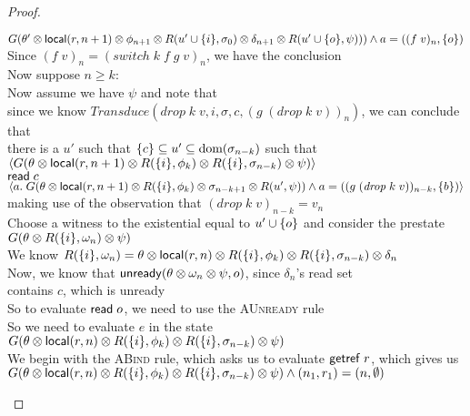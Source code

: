 \begin{proof}
\begin{tabbedproof}
\ooo $G(\theta' \otimes \mathsf{local}({r}, {n+1}) \otimes \phi_{n+1} \otimes R(u' \cup \{{i}\}, \sigma_0) \otimes \delta_{n+1} \otimes R(u' \cup \{{o}\}, \psi))) \land a = ((f\;v)_n, \{{o}\})$\\
\ooo Since $(f\;v)_n = (\mathit{switch}\;k\;f\;g\;v)_n$, we have the conclusion \\
\oo Now suppose $n \geq k$: \\
\ooo Now assume we have $\psi$ and note that  \\
\oooo since we know $\mathit{Transduce}(\mathit{drop}\;k\;v, i, \sigma, c, (g\;(\mathit{drop}\;k\;v))_n)$, we can conclude that \\
\oooo there is a $u'$ such that $\{{c}\} \subseteq u' \subseteq \mbox{dom}({\sigma_{n-k}})$ such that \\
\oooo $\left<G(\theta \otimes \mathsf{local}({r}, {n+1}) \otimes R(\{{i}\}, \phi_k) \otimes R(\{{i}\}, \sigma_{n-k}) \otimes \psi)\right>$ \\
\oooo $\mathsf{read}\; c$\\
\oooo $\left<a.\;G(\theta \otimes \mathsf{local}({r}, {n+1}) \otimes R(\{{i}\}, \phi_k) \otimes \sigma_{n-k+1} \otimes R(u', \psi))
      \land a = ((g\;(\mathit{drop}\;k\;v))_{n-k}, \{{b}\})\right>$ \\
\ooo making use of the observation that $(\mathit{drop}\;k\;v)_{n-k} = v_n$ \\
\ooo Choose a witness to the existential equal to $u' \cup \{{o}\}$ and consider the prestate \\
\ooo $G(\theta \otimes R(\{{i}\}, \omega_n) \otimes \psi)$ \\
\ooo We know $R(\{{i}\}, \omega_n) = \theta \otimes \mathsf{local}({r}, {n}) \otimes R(\{{i}\}, \phi_k) \otimes R(\{{i}\}, \sigma_{n-k}) \otimes \delta_n$ \\
\ooo Now, we know that $\mathsf{unready}({\theta \otimes \omega_n \otimes \psi}, {o})$, since $\delta_n$'s read set \\
\ooo contains $c$, which is unready \\
\ooo So to evaluate $\mathsf{read}\; o$, we need to use the \textsc{AUnready} rule \\
\ooo So we need to evaluate $e$ in the state \\
\ooo $G(\theta \otimes \mathsf{local}({r}, {n}) \otimes R(\{{i}\}, \phi_k) \otimes R(\{{i}\}, \sigma_{n-k}) \otimes \psi)$ \\
\ooo We begin with the \textsc{ABind} rule, which asks us to evaluate $\mathsf{getref}\; r$, which gives us \\
\ooo $G(\theta \otimes \mathsf{local}({r}, {n}) \otimes R(\{{i}\}, \phi_k) \otimes R(\{{i}\}, \sigma_{n-k}) \otimes \psi) \land (n_1,r_1) = (n,\emptyset)$ \\

\end{tabbedproof}
\end{proof}
